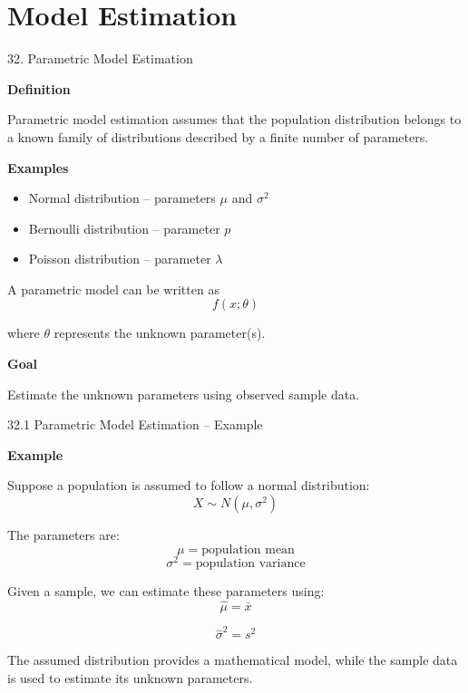 
\section{Model Estimation}


\begin{frame}{32. Parametric Model Estimation}

\textbf{Definition}

Parametric model estimation assumes that the population
distribution belongs to a known family of distributions
described by a finite number of parameters.

\textbf{Examples}

\begin{itemize}
    \item Normal distribution -- parameters $\mu$ and $\sigma^2$
    \item Bernoulli distribution -- parameter $p$
    \item Poisson distribution -- parameter $\lambda$
\end{itemize}

\vspace{0.1cm}

A parametric model can be written as
\[
\boxed{
f(x;\theta)
}
\]

where $\theta$ represents the unknown parameter(s).

\textbf{Goal}

Estimate the unknown parameters using observed sample data.

\end{frame}



\begin{frame}{32.1 Parametric Model Estimation -- Example}

\textbf{Example}

Suppose a population is assumed to follow a normal distribution:
\[
X\sim N(\mu,\sigma^2)
\]

The parameters are:
\[
\mu=\text{population mean}
\]
\[
\sigma^2=\text{population variance}
\]

Given a sample, we can estimate these parameters using:
\[
\hat{\mu}=\bar{x}
\]

\[
\hat{\sigma}^2=s^2
\]

The assumed distribution provides a mathematical model, while
the sample data is used to estimate its unknown parameters.

\end{frame}


